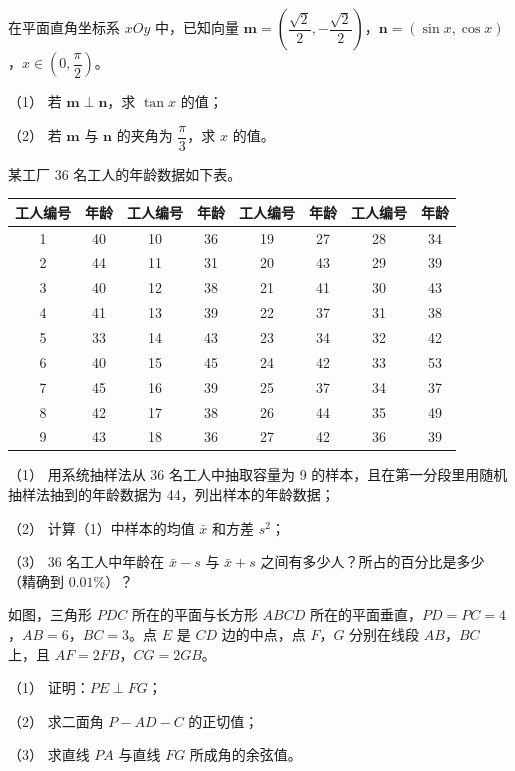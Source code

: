 \begin{question}
在平面直角坐标系 \(xOy\) 中，已知向量 \(\boldsymbol{m}=\left(\dfrac{\sqrt{2}}{2},-\dfrac{\sqrt{2}}{2}\right)\)，\(\boldsymbol{n}=(\sin x,\cos x)\)，\(x\in\left(0,\dfrac{\pi}{2}\right)\)。

（1） 若 \(\boldsymbol{m}\perp\boldsymbol{n}\)，求 \(\tan x\) 的值；

（2） 若 \(\boldsymbol{m}\) 与 \(\boldsymbol{n}\) 的夹角为 \(\dfrac{\pi}{3}\)，求 \(x\) 的值。

\end{question}
\begin{question}
某工厂 36 名工人的年龄数据如下表。

\begin{center}
\begingroup\setlength{\tabcolsep}{4pt}
\begin{tabular}{cccccccc}
\toprule
工人编号 & 年龄 & 工人编号 & 年龄 & 工人编号 & 年龄 & 工人编号 & 年龄 \\
\midrule
1 & 40 & 10 & 36 & 19 & 27 & 28 & 34 \\
2 & 44 & 11 & 31 & 20 & 43 & 29 & 39 \\
3 & 40 & 12 & 38 & 21 & 41 & 30 & 43 \\
4 & 41 & 13 & 39 & 22 & 37 & 31 & 38 \\
5 & 33 & 14 & 43 & 23 & 34 & 32 & 42 \\
6 & 40 & 15 & 45 & 24 & 42 & 33 & 53 \\
7 & 45 & 16 & 39 & 25 & 37 & 34 & 37 \\
8 & 42 & 17 & 38 & 26 & 44 & 35 & 49 \\
9 & 43 & 18 & 36 & 27 & 42 & 36 & 39 \\
\bottomrule
\end{tabular}
\endgroup
\end{center}

（1） 用系统抽样法从 36 名工人中抽取容量为 9 的样本，且在第一分段里用随机抽样法抽到的年龄数据为 44，列出样本的年龄数据；

（2） 计算（1）中样本的均值 \(\bar{x}\) 和方差 \(s^2\)；

（3） 36 名工人中年龄在 \(\bar{x}-s\) 与 \(\bar{x}+s\) 之间有多少人？所占的百分比是多少（精确到 \(0.01\%\)）？

\Needspace{0.4\textheight}
\end{question}
\begin{question}
如图，三角形 \(PDC\) 所在的平面与长方形 \(ABCD\) 所在的平面垂直，\(PD=PC=4\)，\(AB=6\)，\(BC=3\)。点 \(E\) 是 \(CD\) 边的中点，点 \(F\)，\(G\) 分别在线段 \(AB\)，\(BC\) 上，且 \(AF=2FB\)，\(CG=2GB\)。

（1） 证明：\(PE\perp FG\)；

（2） 求二面角 \(P-AD-C\) 的正切值；

（3） 求直线 \(PA\) 与直线 \(FG\) 所成角的余弦值。
\nopagebreak[4]
\begin{center}\end{center}
\nopagebreak[4]
\end{question}
